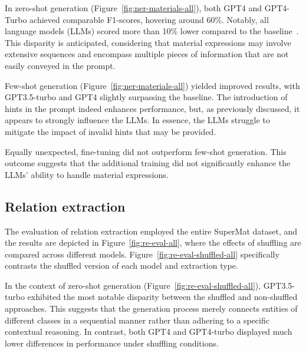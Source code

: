 \documentclass[a4paper]{article}
\begin{document}
In zero-shot generation (Figure~\ref{fig:ner-materials-all}), both GPT4 and GPT4-Turbo achieved comparable F1-scores, hovering around 60\%. Notably, all language models (LLMs) scored more than 10\% lower compared to the baseline~\cite{lfoppiano2023automatic}. This disparity is anticipated, considering that material expressions may involve extensive sequences and encompass multiple pieces of information that are not easily conveyed in the prompt.

Few-shot generation (Figure~\ref{fig:ner-materials-all}) yielded improved results, with GPT3.5-turbo and GPT4 slightly surpassing the baseline. The introduction of hints in the prompt indeed enhances performance, but, as previously discussed, it appears to strongly influence the LLMs. In essence, the LLMs struggle to mitigate the impact of invalid hints that may be provided.

Equally unexpected, fine-tuning did not outperform few-shot generation. This outcome suggests that the additional training did not significantly enhance the LLMs' ability to handle material expressions.

\subsection{Relation extraction}
\label{sec:results-re}

The evaluation of relation extraction employed the entire SuperMat dataset, and the results are depicted in Figure~\ref{fig:re-eval-all}, where the effects of shuffling are compared across different models. Figure~\ref{fig:re-eval-shuffled-all} specifically contrasts the shuffled version of each model and extraction type.

In the context of zero-shot generation (Figure~\ref{fig:re-eval-shuffled-all}), GPT3.5-turbo exhibited the most notable disparity between the shuffled and non-shuffled approaches. This suggests that the generation process merely connects entities of different classes in a sequential manner rather than adhering to a specific contextual reasoning. In contrast, both GPT4 and GPT4-turbo displayed much lower differences in performance under shuffling conditions.
\end{document}
